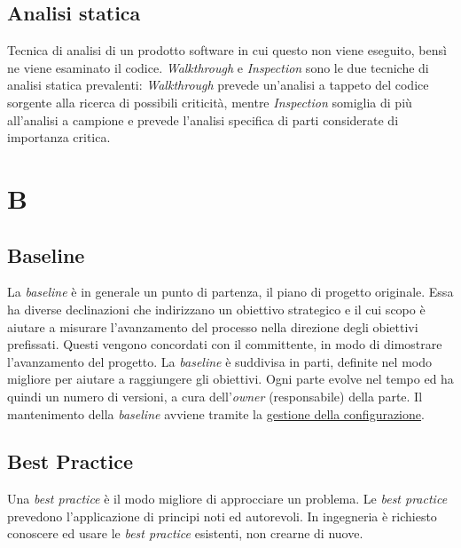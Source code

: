 	\subsection{Analisi statica}
	\label{sec:analisistatica}
	Tecnica di analisi di un prodotto software in cui questo non viene eseguito, bensì ne viene esaminato il codice.
	\emph{Walkthrough} e \emph{Inspection} sono le due tecniche di analisi statica prevalenti: \emph{Walkthrough} prevede un'analisi a tappeto del codice sorgente alla ricerca di possibili criticità, mentre \emph{Inspection} somiglia di più all'analisi a campione e prevede l'analisi specifica di parti considerate di importanza critica.
	\newpage
	\section{B}
	\subsection{Baseline}
	\label{sec:baseline}
	La \emph{baseline} è in generale un punto di partenza, il piano di progetto originale. Essa ha diverse declinazioni che indirizzano un obiettivo strategico e il cui scopo è aiutare a misurare l'avanzamento del processo nella direzione degli obiettivi prefissati. Questi vengono concordati con il committente, in modo di dimostrare l'avanzamento del progetto. La  \emph{baseline} è suddivisa in parti, definite nel modo migliore per aiutare a raggiungere gli obiettivi. Ogni parte evolve nel tempo ed ha quindi un numero di versioni, a cura dell'\emph{owner} (responsabile) della parte. Il mantenimento della  \emph{baseline} avviene tramite la \underline{\hyperref[sec:controlloconfigurazione]{gestione della configurazione}}. 
	
	\subsection{Best Practice}
	\label{sec:bestpractice}
	Una \emph{best practice} è il modo migliore di approcciare un problema. Le \emph{best practice} prevedono l'applicazione di principi noti ed autorevoli. In ingegneria è richiesto conoscere ed usare le \emph{best practice} esistenti, non crearne di nuove.

